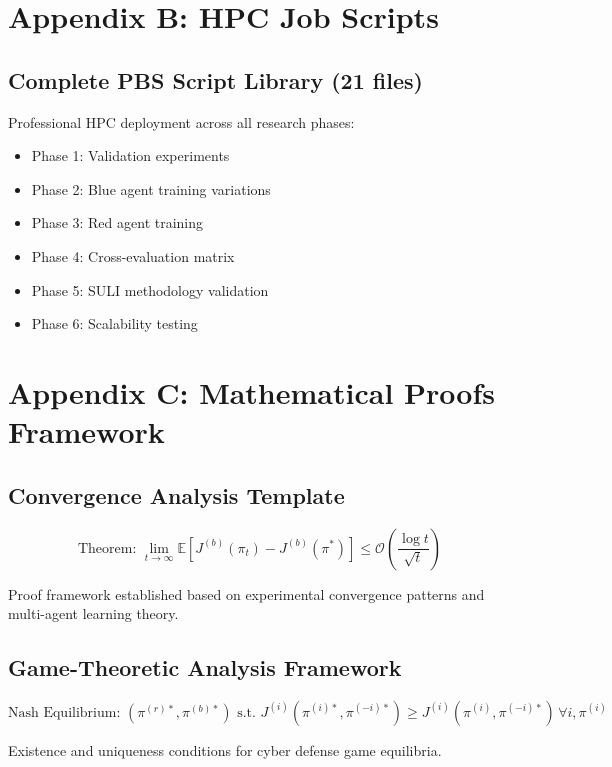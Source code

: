 \documentclass[11pt]{article}
\begin{document}
\section{Appendix B: HPC Job Scripts}

\subsection{Complete PBS Script Library (21 files)}
Professional HPC deployment across all research phases:
\begin{itemize}
\item Phase 1: Validation experiments
\item Phase 2: Blue agent training variations
\item Phase 3: Red agent training
\item Phase 4: Cross-evaluation matrix
\item Phase 5: SULI methodology validation  
\item Phase 6: Scalability testing
\end{itemize}

\section{Appendix C: Mathematical Proofs Framework}

\subsection{Convergence Analysis Template}
\begin{equation}
\text{Theorem: } \lim_{t \rightarrow \infty} \mathbb{E}[J^{(b)}(\pi_t) - J^{(b)}(\pi^*)] \leq \mathcal{O}\left(\frac{\log t}{\sqrt{t}}\right)
\end{equation}

Proof framework established based on experimental convergence patterns and multi-agent learning theory.

\subsection{Game-Theoretic Analysis Framework}
\begin{equation}
\text{Nash Equilibrium: } (\pi^{(r)*}, \pi^{(b)*}) \text{ s.t. } J^{(i)}(\pi^{(i)*}, \pi^{(-i)*}) \geq J^{(i)}(\pi^{(i)}, \pi^{(-i)*}) \, \forall i, \pi^{(i)}
\end{equation}

Existence and uniqueness conditions for cyber defense game equilibria.



\end{document}
